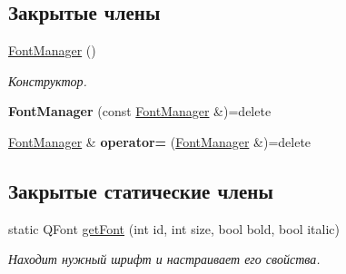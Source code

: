 \subsection*{Закрытые члены}
\begin{DoxyCompactItemize}
\item 
\hyperlink{class_font_manager_a2f89acd28b5bd24e747aacd3208131ef}{Font\+Manager} ()
\begin{DoxyCompactList}\small\item\em Конструктор. \end{DoxyCompactList}\item 
\hypertarget{class_font_manager_ad2df69d8089d4e217de41c05c27a40aa}{}\label{class_font_manager_ad2df69d8089d4e217de41c05c27a40aa} 
{\bfseries Font\+Manager} (const \hyperlink{class_font_manager}{Font\+Manager} \&)=delete
\item 
\hypertarget{class_font_manager_a9ce394118d9c617e9566d8ebfd0c585b}{}\label{class_font_manager_a9ce394118d9c617e9566d8ebfd0c585b} 
\hyperlink{class_font_manager}{Font\+Manager} \& {\bfseries operator=} (\hyperlink{class_font_manager}{Font\+Manager} \&)=delete
\end{DoxyCompactItemize}
\subsection*{Закрытые статические члены}
\begin{DoxyCompactItemize}
\item 
static Q\+Font \hyperlink{class_font_manager_a4b31083bd250791a4a8de80b028b825d}{get\+Font} (int id, int size, bool bold, bool italic)
\begin{DoxyCompactList}\small\item\em Находит нужный шрифт и настраивает его свойства. \end{DoxyCompactList}\end{DoxyCompactItemize}
